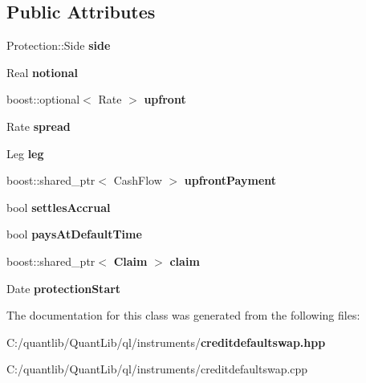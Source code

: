 \subsection*{Public Attributes}
\begin{DoxyCompactItemize}
\item 
Protection\+::\+Side {\bfseries side}\label{class_quant_lib_1_1_credit_default_swap_1_1arguments_a4206fe58e2df19373d9074cb37da7351}

\item 
Real {\bfseries notional}\label{class_quant_lib_1_1_credit_default_swap_1_1arguments_aa6addc4a666457f31288c4e9deab0a89}

\item 
boost\+::optional$<$ Rate $>$ {\bfseries upfront}\label{class_quant_lib_1_1_credit_default_swap_1_1arguments_aba15269a77947f4ec32a47b54502bcab}

\item 
Rate {\bfseries spread}\label{class_quant_lib_1_1_credit_default_swap_1_1arguments_afb55c78d4c822164e5389ccd8c79bd9a}

\item 
Leg {\bfseries leg}\label{class_quant_lib_1_1_credit_default_swap_1_1arguments_a9a42893bb9dae365a33602cc0a3f42f6}

\item 
boost\+::shared\+\_\+ptr$<$ Cash\+Flow $>$ {\bfseries upfront\+Payment}\label{class_quant_lib_1_1_credit_default_swap_1_1arguments_ab3106508cab5d22219922a8b19e1c122}

\item 
bool {\bfseries settles\+Accrual}\label{class_quant_lib_1_1_credit_default_swap_1_1arguments_a2f398658fd04fd7d0413a08ded1a74f0}

\item 
bool {\bfseries pays\+At\+Default\+Time}\label{class_quant_lib_1_1_credit_default_swap_1_1arguments_aab8f2aaefdf644732645abbcf4cecb9f}

\item 
boost\+::shared\+\_\+ptr$<$ {\bf Claim} $>$ {\bfseries claim}\label{class_quant_lib_1_1_credit_default_swap_1_1arguments_a4ba30a0d8115f6c9aecc3b7d86736a22}

\item 
Date {\bfseries protection\+Start}\label{class_quant_lib_1_1_credit_default_swap_1_1arguments_ad8a569415c1f79388ff544a81fde3c44}

\end{DoxyCompactItemize}


The documentation for this class was generated from the following files\+:\begin{DoxyCompactItemize}
\item 
C\+:/quantlib/\+Quant\+Lib/ql/instruments/{\bf creditdefaultswap.\+hpp}\item 
C\+:/quantlib/\+Quant\+Lib/ql/instruments/creditdefaultswap.\+cpp\end{DoxyCompactItemize}
